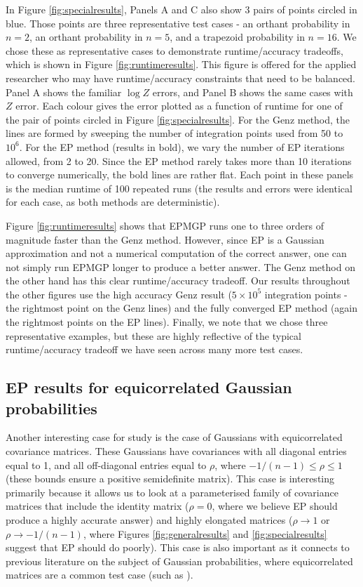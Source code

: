\documentclass[twoside,11pt]{article}
\begin{document}
In Figure \ref{fig:specialresults}, Panels A and C also show 3 pairs of points circled in blue.  Those points are three representative test cases - an orthant probability in $n=2$, an orthant probability in $n=5$, and a trapezoid probability in $n=16$.  We chose these as representative cases to demonstrate runtime/accuracy tradeoffs, which is shown in Figure \ref{fig:runtimeresults}.   This figure is offered for the applied researcher who may have runtime/accuracy constraints that need to be balanced.  Panel A shows the familiar $\log Z$ errors, and Panel B shows the same cases with $Z$ error.  Each colour gives the error plotted as a function of runtime for one of the pair of points circled in Figure \ref{fig:specialresults}.  For the Genz method, the lines are formed by sweeping the number of integration points used from 50 to $10^6$.  For the EP method (results in bold), we vary the number of EP iterations allowed, from 2 to 20.  Since the EP method rarely takes more than 10 iterations to converge numerically, the bold lines are rather flat.   Each point in these panels is the median runtime of 100 repeated runs (the results and errors were identical for each case, as both methods are deterministic).

Figure \ref{fig:runtimeresults} shows that EPMGP runs one to three orders of magnitude faster than the Genz method.  However, since EP is a Gaussian approximation and not a numerical computation of the correct answer, one can not simply run EPMGP longer to produce a better answer.  The Genz method on the other hand has this clear runtime/accuracy tradeoff.   Our results throughout the other figures use the high accuracy Genz result ($5\times 10^5$ integration points - the rightmost point on the Genz lines) and the fully converged EP method (again the rightmost points on the EP lines).  Finally, we note that we chose three representative examples, but these are highly reflective of the typical runtime/accuracy tradeoff we have seen across many more test cases.  


\subsection{EP results for equicorrelated Gaussian probabilities}
\label{sec:equicorrresults}


Another interesting case for study is the case of Gaussians with equicorrelated covariance matrices.  These Gaussians have covariances with all diagonal entries equal to 1, and all off-diagonal entries equal to $\rho$, where $-1/(n-1) \le \rho \le 1$ (these bounds ensure a positive semidefinite matrix).    This case is interesting primarily because it allows us to look at a parameterised family of covariance matrices that include the identity matrix ($\rho = 0$, where we believe EP should produce a highly accurate answer) and highly elongated matrices ($\rho \rightarrow 1$ or $\rho \rightarrow -1/(n-1)$, where Figures \ref{fig:generalresults} and \ref{fig:specialresults} suggest that EP should do poorly).  This case is also important as it connects to previous literature on the subject of Gaussian probabilities, where equicorrelated matrices are a common test case (such as \cite{gassmann2002, shervish1984}).
\end{document}
